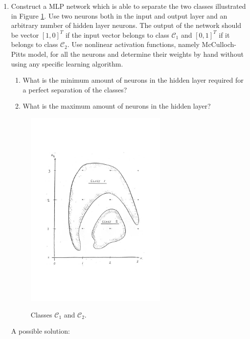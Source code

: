 \begin{enumerate}

\item Construct a MLP network which is able to separate the two
  classes illustrated in Figure \ref{61}. Use two neurons both in the input
  and output layer and an arbitrary number of hidden layer
  neurons. The output of the network should be vector $\left[ 1,
    0\right]^T$ if the input vector belongs to class $\mathcal{C}_1$ and  $\left[ 0,
    1\right]^T$ if it belongs to class $\mathcal{C}_2$. Use nonlinear activation
  functions, namely McCulloch-Pitts model, for all the neurons and
  determine their weights by hand without using any specific learning
  algorithm.
  \begin{enumerate}
  \item What is the minimum amount of neurons in the hidden layer
    required for a perfect separation of the classes?
  \item What is the maximum amount of neurons in the hidden layer?
  \end{enumerate}

  \begin{figure}[hbp]
    \centering
    \includegraphics[width=7cm]{mlp_classification}
    \label{61}
    \caption{Classes $\mathcal{C}_1$ and $\mathcal{C}_2$.}
  \end{figure}

  \begin{solution}

    A possible solution:


\end{solution}
\end{enumerate}
